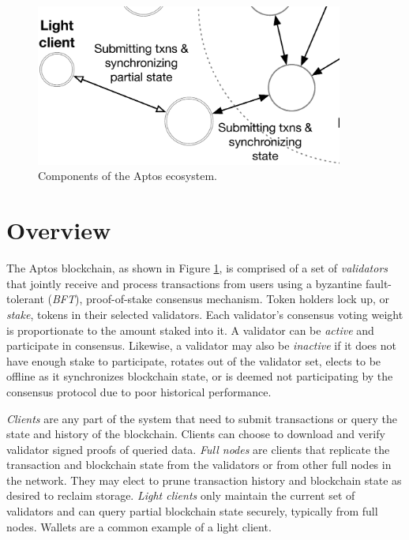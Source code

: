 \documentclass{article}
\begin{document}
\begin{figure}
\centering
\includegraphics[width=0.9\textwidth]{validators.eps}
\caption{\label{fig:aptos_ecosystem}Components of the Aptos ecosystem.}
\end{figure}

\section{Overview}

The Aptos blockchain, as shown in Figure \ref{fig:aptos_ecosystem}, is comprised of a set of \emph{validators} that jointly receive and process transactions from users using a byzantine fault-tolerant (\emph{BFT}), proof-of-stake consensus mechanism. Token holders lock up, or \emph{stake}, tokens in their selected validators. Each validator's consensus voting weight is proportionate to the amount staked into it. A validator can be \emph{active} and participate in consensus. Likewise, a validator may also be \emph{inactive} if it does not have enough stake to participate, rotates out of the validator set, elects to be offline as it synchronizes blockchain state, or is deemed not participating by the consensus protocol due to poor historical performance.

\emph{Clients} are any part of the system that need to submit transactions or query the state and history of the blockchain. Clients can choose to download and verify validator signed proofs of queried data.
\emph{Full nodes} are clients that replicate the transaction and blockchain state from the validators or from other full nodes in the network. They may elect to prune transaction history and blockchain state as desired to reclaim storage.
\emph{Light clients} only maintain the current set of validators and can query partial blockchain state securely, typically from full nodes. Wallets are a common example of a light client.
\end{document}
